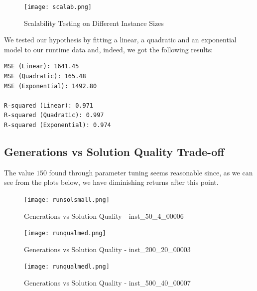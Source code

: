 \documentclass{article}
\begin{document}
\begin{figure}[H]
    \centering
    \texttt{[image: scalab.png]}
    \caption{Scalability Testing on Different Instance Sizes}
    \label{fig:enter-label}
\end{figure}

We tested our hypothesis by fitting a linear, a quadratic and an exponential model to our runtime data and, indeed, we got the following results:

\begin{verbatim}
MSE (Linear): 1641.45
MSE (Quadratic): 165.48
MSE (Exponential): 1492.80

R-squared (Linear): 0.971
R-squared (Quadratic): 0.997
R-squared (Exponential): 0.974
\end{verbatim}

\subsection{Generations vs Solution Quality Trade-off}

The value $150$ found through parameter tuning seems reasonable since, as we can see from the plots below, we have diminishing returns after this point.

\begin{figure}[H]
    \centering
    \texttt{[image: runsolsmall.png]}
    \caption{Generations vs Solution Quality - inst\_50\_4\_00006}
    \label{fig:enter-label}
\end{figure}

\begin{figure}[H]
    \centering
    \texttt{[image: runqualmed.png]}
    \caption{Generations vs Solution Quality - inst\_200\_20\_00003}
    \label{fig:enter-label}
\end{figure}

\begin{figure}[H]
    \centering
    \texttt{[image: runqualmedl.png]}
    \caption{Generations vs Solution Quality - inst\_500\_40\_00007}
    \label{fig:enter-label}
\end{figure}
\end{document}
